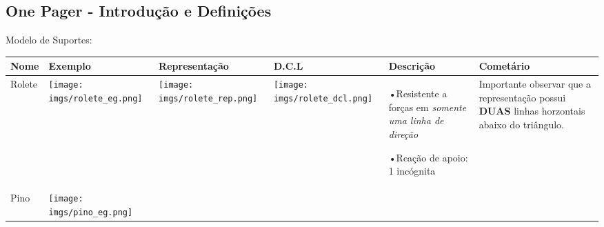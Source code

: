 \documentclass{article}
\begin{document}
\subsection{One Pager - Introdução e Definições}
Modelo de Suportes:
\begin{table}[h]\tiny
    \begin{tabularx}{\textwidth}{|l|X|X|X|l|l|}\hline
        \textbf{Nome}                                               & \textbf{Exemplo} & \textbf{Representação} & \textbf{D.C.L} & \textbf{Descrição} & \textbf{Cometário} \\ \hline

        Rolete                                                      &

        \begin{minipage}{.2\textwidth}
            \centering
            \texttt{[image: imgs/rolete\_eg.png]}
        \end{minipage}    &

        \begin{minipage}{.2\columnwidth}
            \centering
            \texttt{[image: imgs/rolete\_rep.png]}
        \end{minipage}   &

        \begin{minipage}{.2\columnwidth}
            \centering
            \texttt{[image: imgs/rolete\_dcl.png]}
        \end{minipage}   &

        \begin{minipage}{.1\columnwidth}
            \tiny
            •Resistente a forças em \emph{somente uma linha de direção}

            •Reação de apoio: 1 incógnita
        \end{minipage} &

        \begin{minipage}{.1\columnwidth}
            \vspace{5px}
            \tiny
            Importante observar que a representação possui \textbf{DUAS} linhas horzontais abaixo do triângulo.
            \vspace{5px}
        \end{minipage}                                                                 \\ \hline

        Pino                                                        &

        \begin{minipage}{.2\textwidth}
            \centering
            \texttt{[image: imgs/pino\_eg.png]}
        \end{minipage}      &


\end{tabularx}
\end{table}
\end{document}
